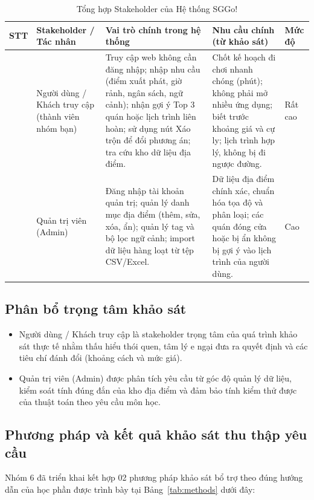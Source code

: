 \documentclass[13pt,a4paper]{extreport}
\newcommand{\hd}[1]{\centering\arraybackslash\textbf{#1}}
\begin{document}
\begin{table}[H]
\centering
\caption{Tổng hợp Stakeholder của Hệ thống SGGo!}
\label{tab:stakeholder}
\setlength{\tabcolsep}{3.5pt}
\begin{tabular}{|>{\raggedright\arraybackslash}c|L{3.2cm}|L{4.6cm}|L{4.8cm}|L{1.4cm}|}
\hline
\hd{STT} & \hd{Stakeholder / Tác nhân} & \hd{Vai trò chính trong hệ thống} & \hd{Nhu cầu chính (từ khảo sát)} & \hd{Mức độ} \\
 & Người dùng / Khách truy cập (thành viên nhóm bạn) &
Truy cập web không cần đăng nhập; nhập nhu cầu (điểm xuất phát, giờ rảnh, ngân sách, ngữ cảnh); nhận gợi ý Top 3 quán hoặc lịch trình liên hoàn; sử dụng nút Xáo trộn để đổi phương án; tra cứu kho dữ liệu địa điểm. &
Chốt kế hoạch đi chơi nhanh chóng (phút); không phải mở nhiều ứng dụng; biết trước khoảng giá và cự ly; lịch trình hợp lý, không bị đi ngược đường. & Rất cao \\
 & Quản trị viên (Admin) &
Đăng nhập tài khoản quản trị; quản lý danh mục địa điểm (thêm, sửa, xóa, ẩn); quản lý tag và bộ lọc ngữ cảnh; import dữ liệu hàng loạt từ tệp CSV/Excel. &
Dữ liệu địa điểm chính xác, chuẩn hóa tọa độ và phân loại; các quán đóng cửa hoặc bị ẩn không bị gợi ý vào lịch trình của người dùng. & Cao \\
\hline
\end{tabular}
\end{table}

\subsection{Phân bổ trọng tâm khảo sát}
\begin{itemize}
    \item Người dùng / Khách truy cập là stakeholder trọng tâm của quá trình khảo sát thực tế nhằm thấu hiểu thói quen, tâm lý e ngại đưa ra quyết định và các tiêu chí đánh đổi (khoảng cách và mức giá).
    \item Quản trị viên (Admin) được phân tích yêu cầu từ góc độ quản lý dữ liệu, kiểm soát tính đúng đắn của kho địa điểm và đảm bảo tính kiểm thử được của thuật toán theo yêu cầu môn học.
\end{itemize}

\subsection{Phương pháp và kết quả khảo sát thu thập yêu cầu}

Nhóm 6 đã triển khai kết hợp 02 phương pháp khảo sát bổ trợ theo đúng hướng dẫn của học phần được trình bày tại Bảng~\ref{tab:methods} dưới đây:
\end{document}
